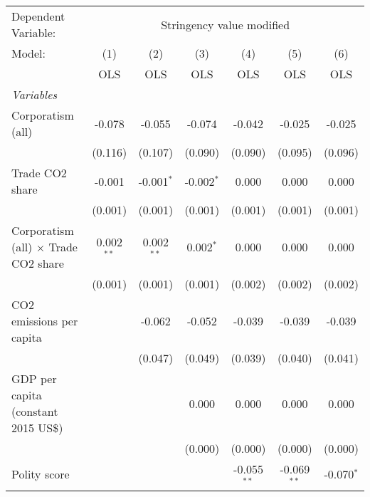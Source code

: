 
\begingroup
\centering
\begin{tabular}{lcccccc}
   \toprule
   Dependent Variable: & \multicolumn{6}{c}{Stringency value modified}\\
   Model:                                      & (1)          & (2)          & (3)          & (4)           & (5)           & (6)\\  
                                               &  OLS         & OLS          & OLS          & OLS           & OLS           & OLS\\  
   \midrule
   \emph{Variables}\\
   Corporatism (all)                           & -0.078       & -0.055       & -0.074       & -0.042        & -0.025        & -0.025\\   
                                               & (0.116)      & (0.107)      & (0.090)      & (0.090)       & (0.095)       & (0.096)\\   
   Trade CO2 share                             & -0.001       & -0.001$^{*}$ & -0.002$^{*}$ & 0.000         & 0.000         & 0.000\\   
                                               & (0.001)      & (0.001)      & (0.001)      & (0.001)       & (0.001)       & (0.001)\\   
   Corporatism (all) $\times$ Trade CO2 share  & 0.002$^{**}$ & 0.002$^{**}$ & 0.002$^{*}$  & 0.000         & 0.000         & 0.000\\   
                                               & (0.001)      & (0.001)      & (0.001)      & (0.002)       & (0.002)       & (0.002)\\   
   CO2 emissions per capita                    &              & -0.062       & -0.052       & -0.039        & -0.039        & -0.039\\   
                                               &              & (0.047)      & (0.049)      & (0.039)       & (0.040)       & (0.041)\\   
   GDP per capita (constant 2015 US\$)         &              &              & 0.000        & 0.000         & 0.000         & 0.000\\   
                                               &              &              & (0.000)      & (0.000)       & (0.000)       & (0.000)\\   
   Polity score                                &              &              &              & -0.055$^{**}$ & -0.069$^{**}$ & -0.070$^{*}$\\   

\end{tabular}
